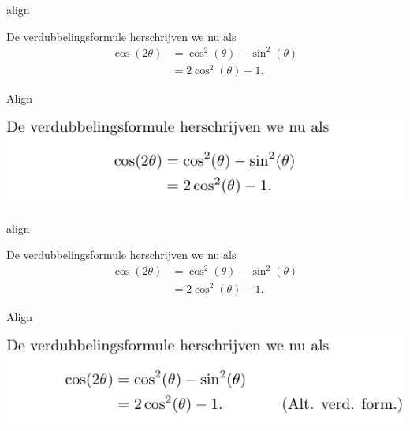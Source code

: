 \documentclass[../presentatie.tex]{subfiles}
\begin{document}

\begin{saveblock}{align}
	\begin{highlightblock}[gobble=8,linewidth=\textwidth,
		framexleftmargin=0.25em,xleftmargin=0.25em]
		De verdubbelingsformule herschrijven we nu als
		\begin{align*}
			\cos(2\theta) &= \cos^2(\theta) - \sin^2(\theta)\\
			&= 2\cos^2(\theta)-1.
		\end{align*}
	\end{highlightblock}
\end{saveblock}


\begin{frame}{Align}

	\includegraphics[width=\linewidth,height=0.4\textheight,keepaspectratio]{assets/5_Formules/mathAlignNoNumbers.pdf}
\end{frame}



\begin{saveblock}{align}
	\begin{highlightblock}[gobble=8,linewidth=\textwidth,
		framexleftmargin=0.25em,xleftmargin=0.25em]
		De verdubbelingsformule herschrijven we nu als
		\begin{align*}
			\cos(2\theta) &= \cos^2(\theta) - \sin^2(\theta)\\
			&= 2\cos^2(\theta)-1. \tag{Alt. verd. form.}
		\end{align*}
	\end{highlightblock}
\end{saveblock}

\begin{frame}{Align}

	\includegraphics[width=\linewidth,height=0.4\textheight,keepaspectratio]{assets/5_Formules/mathTag.pdf}
\end{frame}
\end{document}
